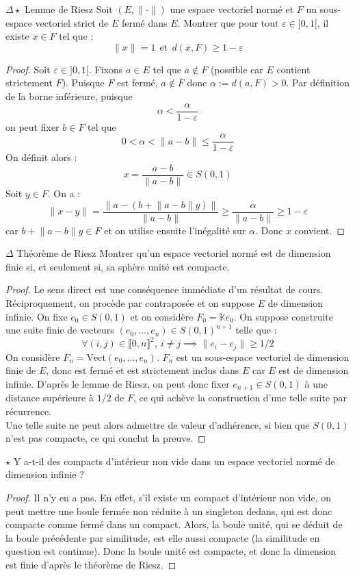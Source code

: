 \documentclass[french,a4paper]{article}
\newcommand{\K}{\mathbb{K}}
\theoremstyle{plain}
\theoremstyle{definition}
\theoremstyle{remark}
\begin{document}
\begin{ex}{$\Delta\star$ Lemme de Riesz}
	Soit $(E,\lVert\cdot\rVert)$ une espace vectoriel normé et $F$ un sous-espace vectoriel strict de $E$ fermé dans $E$. Montrer que pour tout $\varepsilon\in]0,1[$, il existe $x\in F$ tel que : $$\lVert x\rVert=1\ \ \text{et}\ \ d(x,F)\geqslant1-\varepsilon$$
\end{ex}
\begin{proof}
	Soit $\varepsilon\in]0,1[$. Fixons $a\in E$ tel que $a\notin F$ (possible car $E$ contient strictement $F$). Puisque $F$ est fermé, $a\notin\overline{F}$ donc $\alpha:=d(a,F)>0$. Par définition de la borne inférieure, puisque $$\alpha<\frac{\alpha}{1-\varepsilon}$$ on peut fixer $b\in F$ tel que $$0<\alpha<\lVert a-b\rVert\leqslant\frac{\alpha}{1-\varepsilon}$$ On définit alors : $$x=\frac{a-b}{\lVert a-b\rVert}\in S(0,1)$$ Soit $y\in F$. On a : $$\lVert x-y\rVert=\frac{\lVert a-(b+\lVert a-b\rVert y)\rVert}{\lVert a-b\rVert}\geqslant\frac{\alpha}{\lVert a-b\rVert}\geqslant 1-\varepsilon$$ car $b+\lVert a-b\rVert y\in F$ et on utilise ensuite l'inégalité sur $\alpha$. Donc $x$ convient.
\end{proof}

\begin{ex}{$\Delta$ Théorème de Riesz} Montrer qu'un espace vectoriel normé est de dimension finie si, et seulement si, sa sphère unité est compacte.
\end{ex}
\begin{proof}
	Le sens direct est une conséquence immédiate d'un résultat de cours. Réciproquement, on procède par contraposée et on suppose $E$ de dimension infinie. On fixe $e_0\in S(0,1)$ et on considère $F_0=\K e_0$. On suppose construite une suite finie de vecteurs $(e_0,\ldots,e_n)\in S(0,1)^{n+1}$ telle que : $$\forall (i,j)\in\llbracket0,n\rrbracket^2,\ i\ne j\implies \lVert e_i-e_j\rVert\geqslant1/2$$ On considère $F_n=\text{Vect}(e_0,\ldots,e_n)$. $F_n$ est un sous-espace vectoriel de dimension finie de $E$, donc est fermé et est strictement inclus dans $E$ car $E$ est de dimension infinie. D'après le lemme de Riesz, on peut donc fixer $e_{n+1}\in S(0,1)$ à une distance supérieure à $1/2$ de $F$, ce qui achève la construction d'une telle suite par récurrence. \\
	Une telle suite ne peut alors admettre de valeur d'adhérence, si bien que $S(0,1)$ n'est pas compacte, ce qui conclut la preuve.
\end{proof}

\begin{ex}{$\star$}
	Y a-t-il des compacts d'intérieur non vide dans un espace vectoriel normé de dimension infinie ?
\end{ex}
\begin{proof}
	Il n'y en a pas. En effet, s'il existe un compact d'intérieur non vide, on peut mettre une boule fermée non réduite à un singleton dedans, qui est donc compacte comme fermé dans un compact. Alors, la boule unité, qui se déduit de la boule précédente par similitude, est elle aussi compacte (la similitude en question est continue). Donc la boule unité est compacte, et donc la dimension est finie d'après le théorème de Riesz.
\end{proof}
\end{document}

